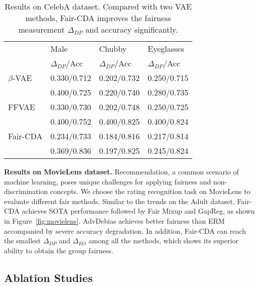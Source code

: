 \documentclass[letterpaper]{article} %
\begin{document}
\begin{table}[!t]
    \centering\small
    \begin{tabular}{llll}
    \hline
    \hline
         & Male  & Chubby &  Eyeglasses \\ 
        ~ & $\Delta_{DP}$/Acc  & $\Delta_{DP}$/Acc  & $\Delta_{DP}$/Acc  \\ \hline
         $\beta$-VAE & 0.330/0.712 & 0.202/0.732 & 0.250/0.715  \\ 
        ~ & 0.400/0.725 & 0.220/0.740 & 0.280/0.735  \\ \hline
        FFVAE & 0.330/0.730 & 0.202/0.748 & 0.250/0.725  \\ 
        ~ & 0.400/0.752 & 0.400/0.825 & 0.400/0.824  \\ \hline
        Fair-CDA & 0.234/0.733 & 0.184/0.816 & 0.217/0.814  \\
        ~ & 0.369/0.836 & 0.197/0.825 & 0.245/0.824  \\ \hline\hline
    \end{tabular}
    \caption{Results on CelebA dataset. Compared with two VAE methods, Fair-CDA improves the fairness measurement $\Delta_{DP}$ and accuracy significantly.}
    \label{table:more_attribute}
\end{table} 



\noindent\textbf{Results on MovieLens dataset.}
Recommendation, a common scenario of machine learning, poses unique challenges for applying fairness and non-discrimination concepts. We choose the rating recognition task on MovieLens to evaluate different fair methods. Similar to the trends on the Adult dataset, Fair-CDA achieves SOTA performance
followed by Fair Mixup and GapReg, as shown in Figure~\ref{fig:movielens}. AdvDebias achieves better fairness than ERM accompanied by severe accuracy degradation. In addition, Fair-CDA can reach the smallest $\Delta_{DP}$ and $\Delta_{EO}$ among all the methods, which shows its superior ability to obtain the group fairness.





 
\subsection{Ablation Studies}
 
\end{document}
